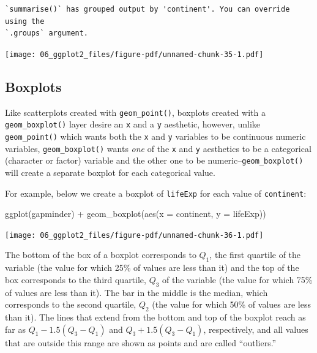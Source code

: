 \documentclass[
  letterpaper,
  DIV=11,
  numbers=noendperiod]{scrreprt}
\newenvironment{Shaded}{\begin{snugshade}}{\end{snugshade}}
\newcommand{\AttributeTok}[1]{\textcolor[rgb]{0.40,0.45,0.13}{#1}}
\newcommand{\FunctionTok}[1]{\textcolor[rgb]{0.28,0.35,0.67}{#1}}
\newcommand{\NormalTok}[1]{\textcolor[rgb]{0.00,0.23,0.31}{#1}}
\newcommand{\SpecialCharTok}[1]{\textcolor[rgb]{0.37,0.37,0.37}{#1}}
\begin{document}
\begin{verbatim}
`summarise()` has grouped output by 'continent'. You can override using the
`.groups` argument.
\end{verbatim}

\texttt{[image: 06\_ggplot2\_files/figure-pdf/unnamed-chunk-35-1.pdf]}

\subsection{Boxplots}\label{boxplots}

Like scatterplots created with \texttt{geom\_point()}, boxplots created
with a \texttt{geom\_boxplot()} layer desire an \texttt{x} and a
\texttt{y} aesthetic, however, unlike \texttt{geom\_point()} which wants
both the \texttt{x} and \texttt{y} variables to be continuous numeric
variables, \texttt{geom\_boxplot()} wants \emph{one} of the \texttt{x}
and \texttt{y} aesthetics to be a categorical (character or factor)
variable and the other one to be numeric--\texttt{geom\_boxplot()} will
create a separate boxplot for each categorical value.

For example, below we create a boxplot of \texttt{lifeExp} for each
value of \texttt{continent}:

\begin{Shaded}
\begin{Highlighting}[]
\FunctionTok{ggplot}\NormalTok{(gapminder) }\SpecialCharTok{+} 
  \FunctionTok{geom\_boxplot}\NormalTok{(}\FunctionTok{aes}\NormalTok{(}\AttributeTok{x =}\NormalTok{ continent, }\AttributeTok{y =}\NormalTok{ lifeExp))}
\end{Highlighting}
\end{Shaded}

\texttt{[image: 06\_ggplot2\_files/figure-pdf/unnamed-chunk-36-1.pdf]}

The bottom of the box of a boxplot corresponds to \(Q_1\), the first
quartile of the variable (the value for which 25\% of values are less
than it) and the top of the box corresponds to the third quartile,
\(Q_3\) of the variable (the value for which 75\% of values are less
than it). The bar in the middle is the median, which corresponds to the
second quartile, \(Q_2\) (the value for which 50\% of values are less
than it). The lines that extend from the bottom and top of the boxplot
reach as far as \(Q_1 - 1.5 (Q_3 - Q_1)\) and \(Q_3 + 1.5 (Q_3 - Q_1)\),
respectively, and all values that are outside this range are shown as
points and are called ``outliers.''
\end{document}
